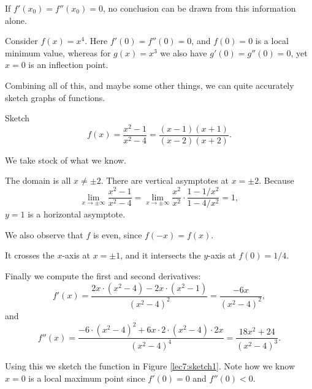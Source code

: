 \begin{remark}
	If $f'(x_0) = f''(x_0) = 0$, no conclusion can be drawn from this information alone.
\end{remark}

\begin{example}
	Consider $f(x) = x^4$.
	Here $f'(0) = f''(0) = 0$, and $f(0) = 0$ is a local minimum value, whereas for $g(x) = x^3$ we also have $g'(0) = g''(0) = 0$, yet $x = 0$ is an inflection point.
\end{example}


Combining all of this, and maybe some other things, we can quite accurately sketch graphs of functions.

\begin{example}
	Sketch
	\[
		f(x) = \frac{x^2 - 1}{x^2 - 4} = \frac{(x - 1)(x + 1)}{(x - 2)(x + 2)}.
	\]

	\noindent
	We take stock of what we know.

	The domain is all $x \neq \pm 2$.
	There are vertical asymptotes at $x = \pm 2$.
	Because
	\[
		\lim_{x \to \pm \infty} \frac{x^2 - 1}{x^2 - 4} = \lim_{x \to \pm \infty} \frac{x^2}{x^2} \cdot \frac{1 - 1/x^2}{1 - 4/x^2} = 1,
	\]
	$y = 1$ is a horizontal asymptote.

	We also observe that $f$ is even, since $f(-x) = f(x)$.

	It crosses the $x$-axis at $x = \pm 1$, and it intersects the $y$-axis at $f(0) = 1/4$.

	Finally we compute the first and second derivatives:
	\[
		f'(x) = \frac{2x \cdot (x^2 - 4) - 2x \cdot (x^2 - 1)}{(x^2 - 4)^2} = \frac{- 6x}{(x^2 - 4)^2},
	\]
	and
	\[
		f''(x) = \frac{-6 \cdot (x^2 - 4)^2 + 6 x \cdot 2 \cdot (x^2 - 4) \cdot 2 x}{(x^2 - 4)^4} = \frac{18x^2 + 24}{(x^2 - 4)^3}.
	\]

	\noindent
	Using this we sketch the function in Figure \ref{lec7:sketch1}.
	Note how we know $x = 0$ is a local maximum point since $f'(0) = 0$ and $f''(0) < 0$.
\end{example}

